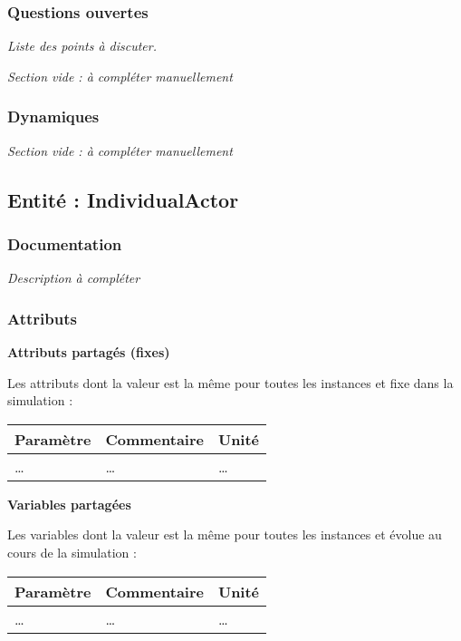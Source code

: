 \documentclass[
]{article}
\begin{document}
\subsubsection{Questions ouvertes}\label{questions-ouvertes}

\emph{Liste des points à discuter.}

\emph{Section vide : à compléter manuellement}

\subsubsection{Dynamiques}\label{dynamiques}

\emph{Section vide : à compléter manuellement}

\subsection{Entité : IndividualActor}\label{entituxe9-individualactor}

\subsubsection{Documentation}\label{documentation-1}

\emph{Description à compléter}

\subsubsection{Attributs}\label{attributs-1}

\textbf{Attributs partagés (fixes)}

Les attributs dont la valeur est la même pour toutes les instances et
fixe dans la simulation :

\begin{longtable}[]{@{}lll@{}}
\toprule\noalign{}
\textbf{Paramètre} & \textbf{Commentaire} & \textbf{Unité} \\
\midrule\noalign{}
\endhead
\bottomrule\noalign{}
\endlastfoot
\ldots{} & \ldots{} & \ldots{} \\
\end{longtable}

\textbf{Variables partagées}

Les variables dont la valeur est la même pour toutes les instances et
évolue au cours de la simulation :

\begin{longtable}[]{@{}lll@{}}
\toprule\noalign{}
\textbf{Paramètre} & \textbf{Commentaire} & \textbf{Unité} \\
\midrule\noalign{}
\endhead
\bottomrule\noalign{}
\endlastfoot
\ldots{} & \ldots{} & \ldots{} \\
\end{longtable}
\end{document}
